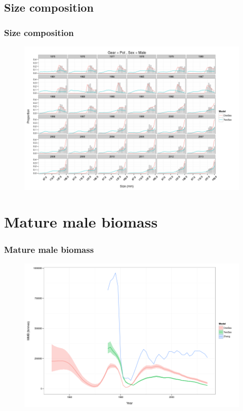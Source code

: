 \documentclass{beamer}
\begin{document}

\subsection{Size composition}
\begin{frame}
\frametitle{Size composition}
\begin{figure}[!htbp]
  \centering
  \includegraphics[width=0.6\linewidth]{figure/sc_pot_m-1.png}
\end{figure}
\end{frame}


\section{Mature male biomass}


\begin{frame}
\frametitle{Mature male biomass}
\begin{figure}[!htbp]
  \centering
  \includegraphics[width=0.6\linewidth]{figure/spawning_stock_biomass-1.png}
\end{figure}
\end{frame}

\end{document}
